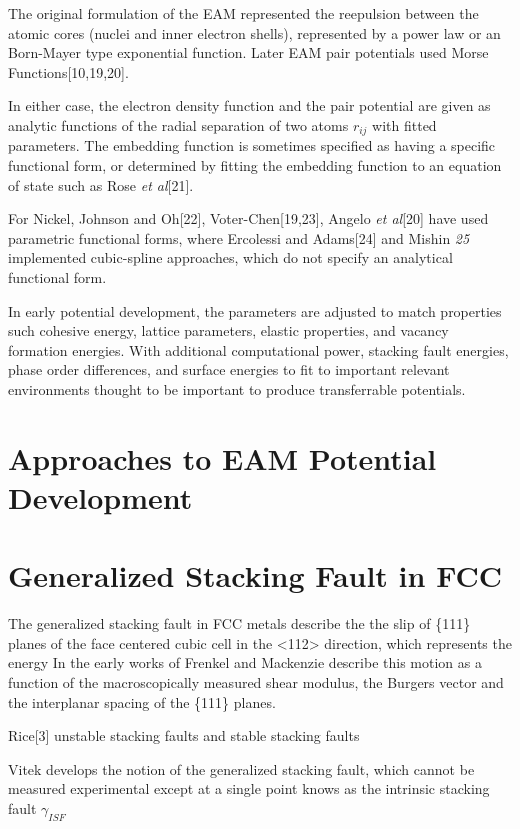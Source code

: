The original formulation of the EAM represented the reepulsion between the atomic cores (nuclei and inner electron shells), represented by a power law or an Born-Mayer type exponential function.  Later EAM pair potentials used Morse Functions[10,19,20].

In either case, the electron density function and the pair potential are given as analytic functions of the radial separation of two atoms $r_{ij}$ with fitted parameters.  The embedding function is sometimes specified as having a specific functional form, or determined by fitting the embedding function to an equation of state such as Rose \emph{et al}[21].

For Nickel, Johnson and Oh[22], Voter-Chen[19,23], Angelo \emph{et al}[20] have used parametric functional forms, where Ercolessi and Adams[24] and Mishin \emph{25} implemented cubic-spline approaches, which do not specify an analytical functional form.

In early potential development, the parameters are adjusted to match properties such cohesive energy, lattice parameters, elastic properties, and vacancy formation energies.  With additional computational power, stacking fault energies, phase order differences, and surface energies to fit to important relevant environments thought to be important to produce transferrable potentials.

\section{Approaches to EAM Potential Development}


\section{Generalized Stacking Fault in FCC}
The generalized stacking fault in FCC metals describe the the slip of \{111\} planes of the face centered cubic cell in the <112> direction, which represents the energy
In the early works of Frenkel and Mackenzie describe this motion as a function of the macroscopically measured shear modulus, the Burgers vector and the interplanar spacing of the \{111\} planes.

Rice[3] unstable stacking faults and stable stacking faults

Vitek\cite{vitek1966_gsf,vitek1968_gsf} develops the notion of the generalized stacking fault, which cannot be measured experimental except at a single point knows as the intrinsic stacking fault $\gamma_{ISF}$

